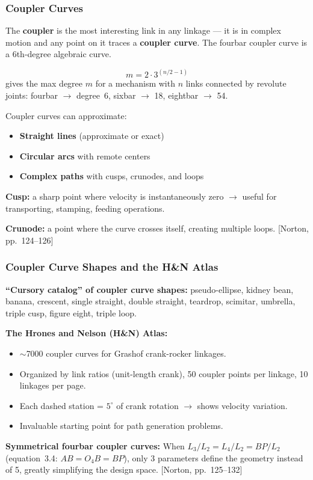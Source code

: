 \documentclass[10pt,aspectratio=43]{beamer}
\newcommand{\pref}[1]{\vfill\hfill{\scriptsize\color{gray}[Norton, pp.~#1]}}
\begin{document}

\begin{frame}
\frametitle{Coupler Curves}

\begin{yellowbox}
The \textbf{coupler} is the most interesting link in any linkage --- it is in complex motion and any point on it traces a \textbf{coupler curve}. The fourbar coupler curve is a 6th-degree algebraic curve.
\end{yellowbox}

\vspace{4pt}
\[
  m = 2 \cdot 3^{(n/2 - 1)} \tag{3.3}
\]
gives the max degree $m$ for a mechanism with $n$ links connected by revolute joints: fourbar $\to$ degree~6, sixbar $\to$ 18, eightbar $\to$ 54.

\vspace{4pt}
Coupler curves can approximate:
\begin{itemize}
  \item \textbf{Straight lines} (approximate or exact)
  \item \textbf{Circular arcs} with remote centers
  \item \textbf{Complex paths} with cusps, crunodes, and loops
\end{itemize}

\vspace{4pt}
\textbf{Cusp:} a sharp point where velocity is instantaneously zero $\to$ useful for transporting, stamping, feeding operations.

\textbf{Crunode:} a point where the curve crosses itself, creating multiple loops.
\pref{124--126}
\end{frame}

\begin{frame}
\frametitle{Coupler Curve Shapes and the H\&N Atlas}

\textbf{``Cursory catalog'' of coupler curve shapes:} pseudo-ellipse, kidney bean, banana, crescent, single straight, double straight, teardrop, scimitar, umbrella, triple cusp, figure eight, triple loop.

\vspace{6pt}
\textbf{The Hrones and Nelson (H\&N) Atlas:}
\begin{itemize}
  \item $\sim$7000 coupler curves for Grashof crank-rocker linkages.
  \item Organized by link ratios (unit-length crank), 50 coupler points per linkage, 10 linkages per page.
  \item Each dashed station = $5^\circ$ of crank rotation $\to$ shows velocity variation.
  \item Invaluable starting point for path generation problems.
\end{itemize}

\vspace{4pt}
\textbf{Symmetrical fourbar coupler curves:} When $L_3/L_2 = L_4/L_2 = BP/L_2$ (equation~3.4: $AB = O_4B = BP$), only 3 parameters define the geometry instead of 5, greatly simplifying the design space.
\pref{125--132}
\end{frame}
\end{document}
